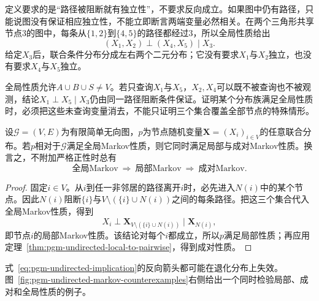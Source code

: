 定义要求的是“路径被阻断就有独立性”，不要求反向成立。如果图中仍有路径，只能说图没有保证相应独立性，不能立即断言两端变量必然相关。在两个三角形共享节点$3$的图中，每条从$\{1,2\}$到$\{4,5\}$的路径都经过$3$，所以全局性质给出
\[
  (X_1,X_2)\perp(X_4,X_5)\mid X_3.
\]
给定$X_3$后，联合条件分布分成左右两个二元分布；它没有要求$X_1$与$X_2$独立，也没有要求$X_4$与$X_5$独立。

全局性质允许$A\cup B\cup S\neq V$。若只查询$X_1$与$X_5$，$X_2,X_4$可以既不被查询也不被观测，结论$X_1\perp X_5\mid X_3$仍由同一路径阻断条件保证。证明某个分布族满足全局性质时，必须把这些未查询变量消去，不能只证明三个集合覆盖全部节点的特殊情形。

\begin{theorem}[全局Markov性质蕴含局部与成对Markov性质]
  \label{thm:pgm-undirected-global-implications}
  设$\mathcal{G}=(V,E)$为有限简单无向图，$p$为节点随机变量$\bm{X}=(X_i)_{i\in V}$的任意联合分布。若$p$相对于$\mathcal{G}$满足全局Markov性质，则它同时满足局部与成对Markov性质。换言之，不附加严格正性时总有
  \begin{equation}
    \text{全局Markov}
    \ \Longrightarrow\ \text{局部Markov}
    \ \Longrightarrow\ \text{成对Markov}.
    \label{eq:pgm-undirected-implication}
  \end{equation}
\end{theorem}

\begin{proof}
固定$i\in V$。从$i$到任一非邻居的路径离开$i$时，必先进入$N(i)$中的某个节点。因此$N(i)$阻断$\{i\}$与$V\setminus(\{i\}\cup N(i))$之间的每条路径。把这三个集合代入全局Markov性质，得到
\[
  X_i\perp\bm{X}_{V\setminus(\{i\}\cup N(i))}
  \mid\bm{X}_{N(i)},
\]
即节点$i$的局部Markov性质。该结论对每个$i$都成立，所以$p$满足局部性质；再应用定理~\ref{thm:pgm-undirected-local-to-pairwise}，得到成对性质。
\end{proof}

式~\eqref{eq:pgm-undirected-implication}的反向箭头都可能在退化分布上失效。图~\ref{fig:pgm-undirected-markov-counterexamples}右侧给出一个同时检验局部、成对和全局性质的例子。

